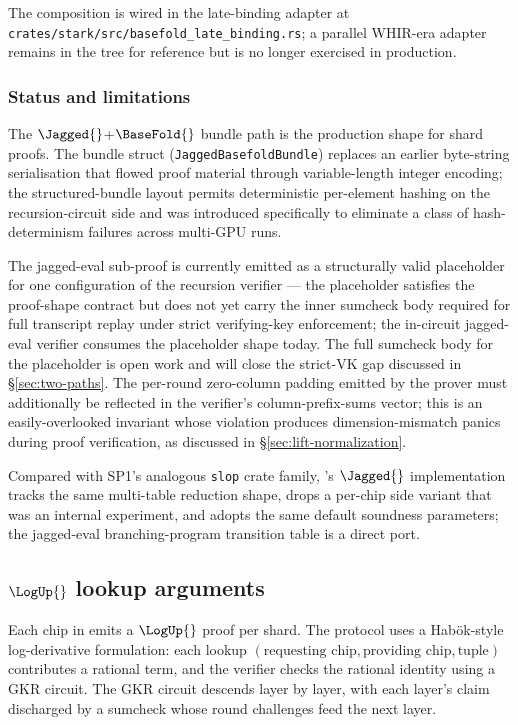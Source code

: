 The composition is wired in the late-binding adapter at \texttt{crates/stark/src/basefold\_late\_binding.rs}; a parallel WHIR-era adapter remains in the tree for reference but is no longer exercised in production.

\subsubsection{Status and limitations}

The $\Jagged{}$+$\BaseFold{}$ bundle path is the production shape for shard proofs. The bundle struct (\texttt{JaggedBasefoldBundle}) replaces an earlier byte-string serialisation that flowed proof material through variable-length integer encoding; the structured-bundle layout permits deterministic per-element hashing on the recursion-circuit side and was introduced specifically to eliminate a class of hash-determinism failures across multi-GPU runs.

The jagged-eval sub-proof is currently emitted as a structurally valid placeholder for one configuration of the recursion verifier — the placeholder satisfies the proof-shape contract but does not yet carry the inner sumcheck body required for full transcript replay under strict verifying-key enforcement; the in-circuit jagged-eval verifier consumes the placeholder shape today. The full sumcheck body for the placeholder is open work and will close the strict-VK gap discussed in \S\ref{sec:two-paths}. The per-round zero-column padding emitted by the prover must additionally be reflected in the verifier's column-prefix-sums vector; this is an easily-overlooked invariant whose violation produces dimension-mismatch panics during proof verification, as discussed in \S\ref{sec:lift-normalization}.

Compared with SP1's analogous \texttt{slop} crate family, \Zirenver{}'s $\Jagged{}$ implementation tracks the same multi-table reduction shape, drops a per-chip side variant that was an internal experiment, and adopts the same default soundness parameters; the jagged-eval branching-program transition table is a direct port.

\subsection{$\LogUp{}$ lookup arguments}

Each chip in \Zirenver{} emits a $\LogUp{}$ proof per shard. The protocol uses a Habök-style log-derivative formulation: each lookup $(\text{requesting chip}, \text{providing chip}, \text{tuple})$ contributes a rational term, and the verifier checks the rational identity using a GKR circuit. The GKR circuit descends layer by layer, with each layer's claim discharged by a sumcheck whose round challenges feed the next layer.

